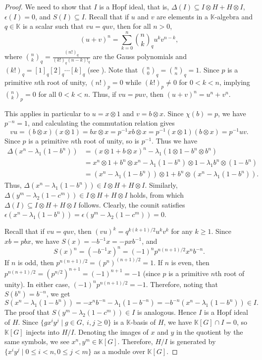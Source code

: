 \documentclass[11pt, twoside]{amsart}
\theoremstyle{definition}
\newcommand{\KK}{\mathbb{K}}
\begin{document}
\begin{proof}
    We need to show that $I$ is a Hopf ideal, that is, $\Delta(I) \subseteq I \otimes H + H \otimes I$, $\epsilon(I) = 0$, and $S(I) \subseteq I$. Recall that if $u$ and $v$ are elements in a $\KK$-algebra and $q \in \KK$ is a scalar such that $vu = quv$, then for all $n > 0$,
    \[(u + v)^n = \sum_{k=0}^{n}\binom{n}{k}_q u^k v^{n-k},\]
    where $\binom{n}{k}_q = \frac{(n!)_q}{(k!)_q (n - k)!_q}$ are the Gauss polynomials and $(k!)_q = [1]_q [2]_q \cdots [k]_q$ (see \cite[Proposition IV.2.2]{Kassel}). Note that $\binom{n}{0}_q = \binom{n}{n}_q = 1$. Since $p$ is a primitive $n$th root of unity, $(n!)_p = 0$ while $(k!)_p \neq 0$ for $0 < k < n$, implying $\binom{n}{k}_p = 0$ for all $0 < k < n$. Thus, if $vu = puv$, then $(u + v)^n = u^n + v^n$. 
    
    This applies in particular to $u = x \otimes 1$ and $v = b \otimes x$. Since $\chi(b)=p$, we have $p^{-n} = 1$, and calculating the commutation relation gives
    \[
        vu = (b \otimes x)(x \otimes 1) = bx \otimes x = p^{-1} xb \otimes x = p^{-1} (x \otimes 1)(b \otimes x) = p^{-1}uv.
    \]
    Since $p$ is a primitive $n$th root of unity, so is $p^{-1}$. Thus we have
    \begin{align*}
        \Delta(x^n - \lambda_1 (1 - b^n)) & = (x \otimes 1 + b \otimes x)^n - \lambda_1 (1 \otimes 1 - b^n \otimes b^n)\\
        & = x^n \otimes 1 + b^n \otimes x^n - \lambda_1 (1 - b^n) \otimes 1 - \lambda_1 b^n \otimes (1 - b^n)\\
        & = (x^n - \lambda_1 (1 - b^n)) \otimes 1 + b^n \otimes (x^n - \lambda_1 (1 - b^n)).
    \end{align*}
    Thus, $\Delta(x^n - \lambda_1 (1 - b^n)) \in I \otimes H + H \otimes I$. Similarly, $\Delta(y^m - \lambda_2 (1 - c^m)) \in I \otimes H + H \otimes I$ holds, from which $\Delta(I) \subseteq I\otimes H + H \otimes I$ follows. Clearly, the counit satisfies $\epsilon(x^n - \lambda_1 (1 - b^n)) = \epsilon(y^m - \lambda_2 (1 - c^m)) = 0$. 
    
    Recall that if $vu = quv$, then $(vu)^k = q^{k(k+1)/2}u^k v^k$ for any $k \geq 1$. Since $xb = pbx$, we have $S(x) = -b^{-1}x = -p x b^{-1}$, and
    \[ S(x)^n = (-b^{-1}x)^n = (-1)^n p^{n(n+1)/2}x^n b^{-n}. \]
    If $n$ is odd, then $p^{n(n+1)/2} = (p^n)^{(n+1)/2} = 1$. If $n$ is even, then $p^{n(n+1)/2} = (p^{n/2})^{n+1} = (-1)^{n+1} = -1$ (since $p$ is a primitive $n$th root of unity). In either case, $(-1)^n p^{n(n+1)/2} = -1$. Therefore, noting that $S(b^n) = b^{-n}$, we get
    \[
        S(x^n - \lambda_1 (1 - b^n)) = -x^n b^{-n} - \lambda_1 (1 - b^{-n}) = -b^{-n}(x^n - \lambda_1 (1 - b^n)) \in I.
    \]
    The proof that $S(y^m - \lambda_2 (1 - c^m)) \in I$ is analogous. Hence $I$ is a Hopf ideal of $H$. Since $\{gx^i y^j \mid g \in G,\ i,j \geq 0\}$ is a $\KK$-basis of $H$, we have $\KK[G] \cap I = 0$, so $\KK[G]$ injects into $H/I$. Denoting the images of $x$ and $y$ in the quotient by the same symbols, we see $x^n, y^m \in \KK[G]$. Therefore, $H/I$ is generated by $\{x^i y^j \mid 0 \leq i < n, 0 \leq j < m\}$ as a module over $\KK[G]$.
\end{proof}
\end{document}
